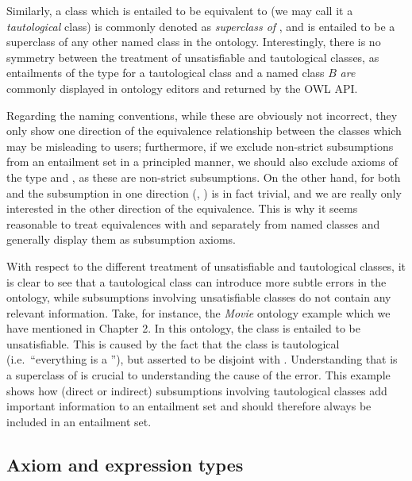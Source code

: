 Similarly, a class which is entailed to be equivalent to \thing (we may call it a \emph{tautological} class) is commonly denoted as \emph{superclass of \thing}, and is entailed to be a superclass of any other named class in the ontology. Interestingly, there is no symmetry between the treatment of unsatisfiable and tautological classes, as entailments of the type  for a tautological class  and a named class $B$ \emph{are} commonly displayed in ontology editors and returned by the OWL API. 

Regarding the naming conventions, while these are obviously not incorrect, they only show one direction of the equivalence relationship between the classes which may be misleading to users; furthermore, if we exclude non-strict subsumptions from an entailment set in a principled manner, we should also exclude axioms of the type  and , as these are non-strict subsumptions. On the other hand, for both \thing and \nothing the subsumption in one direction (, ) is in fact trivial, and we are really only interested in the other direction of the equivalence. This is why it seems reasonable to treat equivalences with \thing and \nothing separately from named classes and generally display them as subsumption axioms.

With respect to the different treatment of unsatisfiable and tautological classes, it is clear to see that a tautological class can introduce more subtle errors in the ontology, while subsumptions involving unsatisfiable classes do not contain any relevant information. Take, for instance, the \emph{Movie} ontology example which we have mentioned in Chapter 2. In this ontology, the class  is entailed to be unsatisfiable. This is caused by the fact that the class  is tautological (i.e.\ \enquote{everything is a }), but asserted to be disjoint with . Understanding that  is a superclass of  is crucial to understanding the cause of the error. This example shows how (direct or indirect) subsumptions involving tautological classes add important information to an entailment set and should therefore always be included in an entailment set.


\subsection{Axiom and expression types}


